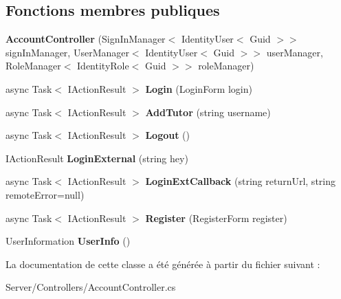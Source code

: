 \subsection*{Fonctions membres publiques}
\begin{DoxyCompactItemize}
\item 
\mbox{\label{class_mediwatch_1_1_server_1_1_controllers_1_1_account_controller_a68b985c608e83237a0b41202149d7cf7}} 
{\bfseries Account\+Controller} (Sign\+In\+Manager$<$ Identity\+User$<$ Guid $>$$>$ sign\+In\+Manager, User\+Manager$<$ Identity\+User$<$ Guid $>$$>$ user\+Manager, Role\+Manager$<$ Identity\+Role$<$ Guid $>$$>$ role\+Manager)
\item 
\mbox{\label{class_mediwatch_1_1_server_1_1_controllers_1_1_account_controller_a0eca1869d875e9cdfbc6e9bc4540ae41}} 
async Task$<$ I\+Action\+Result $>$ {\bfseries Login} (Login\+Form login)
\item 
\mbox{\label{class_mediwatch_1_1_server_1_1_controllers_1_1_account_controller_ab2521eccf3ab6c752eb5e414f6463528}} 
async Task$<$ I\+Action\+Result $>$ {\bfseries Add\+Tutor} (string username)
\item 
\mbox{\label{class_mediwatch_1_1_server_1_1_controllers_1_1_account_controller_a177b908ddf5a0c4ec5e3269e4cbcb252}} 
async Task$<$ I\+Action\+Result $>$ {\bfseries Logout} ()
\item 
\mbox{\label{class_mediwatch_1_1_server_1_1_controllers_1_1_account_controller_a7f1a46f59d4b8fff4e948992fcf9f605}} 
I\+Action\+Result {\bfseries Login\+External} (string hey)
\item 
\mbox{\label{class_mediwatch_1_1_server_1_1_controllers_1_1_account_controller_ab3cb65a34f1dd5de150ebf5b956ff414}} 
async Task$<$ I\+Action\+Result $>$ {\bfseries Login\+Ext\+Callback} (string return\+Url, string remote\+Error=null)
\item 
\mbox{\label{class_mediwatch_1_1_server_1_1_controllers_1_1_account_controller_a0a0cf410c96bdacc714cb77c1d52861d}} 
async Task$<$ I\+Action\+Result $>$ {\bfseries Register} (Register\+Form register)
\item 
\mbox{\label{class_mediwatch_1_1_server_1_1_controllers_1_1_account_controller_a35118ac6cb00d088863119bf4cbdc30f}} 
User\+Information {\bfseries User\+Info} ()
\end{DoxyCompactItemize}


La documentation de cette classe a été générée à partir du fichier suivant \+:\begin{DoxyCompactItemize}
\item 
Server/\+Controllers/Account\+Controller.\+cs\end{DoxyCompactItemize}
